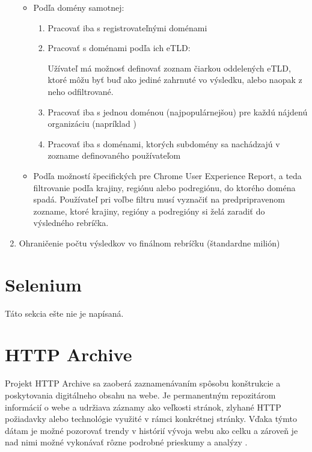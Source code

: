 \begin{enumerate}
\begin{itemize}
        \pagebreak

        \item Podľa domény samotnej:
        \begin{enumerate}
            \item Pracovať iba s registrovateľnými doménami
            \item Pracovať s doménami podľa ich eTLD:
            
            Užívateľ má možnosť definovať zoznam čiarkou oddelených eTLD, ktoré môžu byť buď ako jediné zahrnuté vo
            výsledku, alebo naopak z neho odfiltrované.
            
            \item Pracovať iba s jednou doménou (najpopulárnejšou) pre každú nájdenú organizáciu (napríklad )
            \item Pracovať iba s doménami, ktorých subdomény sa nachádzajú v zozname definovaného používateľom
        \end{enumerate}

        \item Podľa možností špecifických pre Chrome User Experience Report, a teda filtrovanie podľa krajiny, regiónu alebo podregiónu, do ktorého doména spadá. Používateľ pri voľbe filtru musí vyznačiť na predpripravenom zozname, ktoré krajiny, regióny a podregióny si želá zaradiť do výsledného rebríčka.
    \end{itemize}

    \item Ohraničenie počtu výsledkov vo finálnom rebríčku (štandardne milión)
    
\end{enumerate}


\section{Selenium}
\label{selenium}

Táto sekcia ešte nie je napísaná.

\section{HTTP Archive}
\label{httparchive}

Projekt HTTP Archive sa zaoberá zaznamenávaním spôsobu konštrukcie a poskytovania digitálneho obsahu na webe. Je permanentným repozitárom informácií o webe a udržiava záznamy ako veľkosti
stránok, zlyhané HTTP požiadavky alebo technológie využité v rámci konkrétnej stránky. Vďaka týmto dátam je možné pozorovať trendy v histórií vývoja webu ako celku a zároveň je nad nimi možné vykonávať
rôzne podrobné prieskumy a analýzy \cite{httparchive-about}. 

